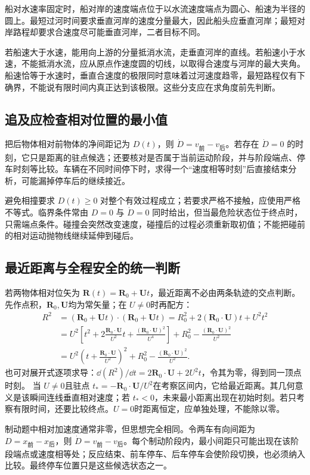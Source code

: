 船对水速率固定时，船对岸的速度端点位于以水流速度端点为圆心、船速为半径的圆上。最短过河时间要求垂直河岸的速度分量最大，因此船头应垂直河岸；最短对岸路程却要求合速度尽可能垂直河岸，二者目标不同。

若船速大于水速，能用向上游的分量抵消水流，走垂直河岸的直线。若船速小于水速，不能抵消水流，应从原点作速度圆的切线，以取得合速度与河岸的最大夹角。船速恰等于水速时，垂直合速度的极限同时意味着过河速度趋零，最短路程仅有下确界，不能说有限时间内真正达到该极限。这些分支应在求角度前先判断。

\subsection{追及应检查相对位置的最小值}
把后物体相对前物体的净间距记为 $D(t)$，则 $\dot D=v_{\text{前}}-v_{\text{后}}$。若存在 $\dot D=0$ 的时刻，它只是距离的驻点候选；还要核对是否属于当前运动阶段，并与阶段端点、停车时刻等比较。车辆在不同时间停下时，求得一个“速度相等时刻”后直接结束分析，可能漏掉停车后的继续接近。

避免相撞要求 $D(t)\ge0$ 对整个有效过程成立；若要求严格不接触，应使用严格不等式。临界条件常由 $D=0$ 与 $\dot D=0$ 同时给出，但当最危险状态位于终点时，只需端点条件。碰撞会突然改变速度，碰撞后的过程必须重新取初值；不能把碰前的相对运动抛物线继续延伸到碰后。
\subsection{最近距离与全程安全的统一判断}
若两物体相对位矢为 $\bm R(t)=\bm R_0+\bm U t$，最近距离不必由两条轨迹的交点判断。先作点积，$\bm R_0,\bm U$均为常矢量；在 $U\ne0$时再配方：
\begin{align*}
 R^2&=(\bm R_0+\bm U t)\cdot(\bm R_0+\bm U t)
 =R_0^2+2(\bm R_0\cdot\bm U)t+U^2t^2\\
 &=U^2\left[t^2+2\frac{\bm R_0\cdot\bm U}{U^2}t
 +\frac{(\bm R_0\cdot\bm U)^2}{U^4}\right]
 +R_0^2-\frac{(\bm R_0\cdot\bm U)^2}{U^2}\\
 &=U^2\left(t+\frac{\bm R_0\cdot\bm U}{U^2}\right)^2
 +R_0^2-\frac{(\bm R_0\cdot\bm U)^2}{U^2}.
\end{align*}
也可对展开式逐项求导：$\dd(R^2)/\dd t=2\bm R_0\cdot\bm U+2U^2t$，令其为零，得到同一顶点时刻。
当 $U\ne0$且驻点 $t_*=-\bm R_0\cdot\bm U/U^2$在考察区间内，它给最近距离。其几何意义是该瞬间连线垂直相对速度；若 $t_*<0$，未来最小距离出现在初始时刻。若只考察有限时间，还要比较终点。$U=0$时距离恒定，应单独处理，不能除以零。

制动题中相对加速度通常非零，但思想完全相同。令两车有向间距为 $D=x_{\text{前}}-x_{\text{后}}$，则 $\dot D=v_{\text{前}}-v_{\text{后}}$。每个制动阶段内，最小间距只可能出现在该阶段端点或速度相等处；反应结束、前车停车、后车停车会使阶段切换，也必须纳入比较。最终停车位置只是这些候选状态之一。

